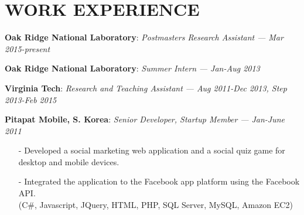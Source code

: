 \section{WORK EXPERIENCE} 
\vspace{0.03in} 
{\bf Oak Ridge National Laboratory}: \emph{Postmasters Research Assistant}
{\it \footnotesize --- Mar 2015-present}
\vspace{-0.15in}

{\bf Oak Ridge National Laboratory}: \emph{Summer Intern}
{\it \footnotesize --- Jan-Aug 2013}
\vspace{-0.15in}

{\bf Virginia Tech}: \emph{Research and Teaching Assistant}
{\it \footnotesize --- Aug 2011-Dec 2013, Step 2013-Feb 2015}
\vspace{-0.15in}

{\bf Pitapat Mobile, S. Korea}: \emph{Senior Developer, Startup Member}
{\it \footnotesize --- Jan-June 2011}
\begin{itemize}[leftmargin=*]
\setlength\itemsep{-0.02in}
 \item[-] Developed a social marketing web application and a social quiz game for 
          desktop and mobile devices.
 \item[-] Integrated the application to the Facebook app platform using the Facebook API.
\\
  {\small(C\#, Javascript, JQuery, HTML, PHP, SQL Server, MySQL, Amazon EC2)}
\end{itemize}
\vspace{-0.15in}

